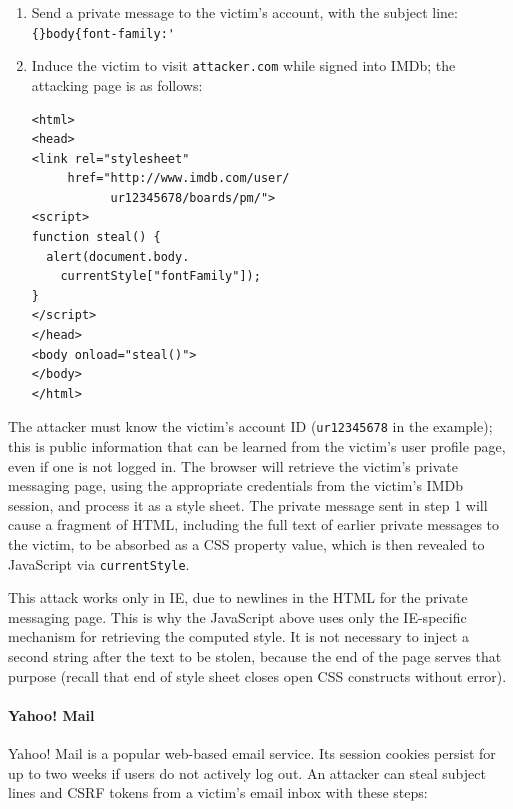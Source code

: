 \documentclass{acm_proc_article-sp}
\begin{document}
\begin{enumerate}
\item Send a private message to the victim's account, with the subject
  line: \verb|{}body{font-family:'|
\item Induce the victim to visit \texttt{attacker.com} while signed
  into IMDb; the attacking page is as follows:
\begin{verbatim}
<html>
<head>
<link rel="stylesheet"
     href="http://www.imdb.com/user/
           ur12345678/boards/pm/">
<script>
function steal() {
  alert(document.body.
    currentStyle["fontFamily"]);
}
</script>
</head>
<body onload="steal()">
</body>
</html>
\end{verbatim}
\end{enumerate}

The attacker must know the victim's account ID (\texttt{ur12345678} in
the example); this is public information that can be learned from the
victim's user profile page, even if one is not logged in.  The browser
will retrieve the victim's private messaging page, using the
appropriate credentials from the victim's IMDb session, and process it
as a style sheet.  The private message sent in step 1 will cause a
fragment of HTML, including the full text of earlier private messages
to the victim, to be absorbed as a CSS property value, which is then
revealed to JavaScript via \texttt{currentStyle}.

This attack works only in IE, due to newlines in the HTML for the
private messaging page.  This is why the JavaScript above uses only
the IE-specific mechanism for retrieving the computed style.  It is
not necessary to inject a second string after the text to be stolen,
because the end of the page serves that purpose (recall that end of
style sheet closes open CSS constructs without error).

\paragraph{Yahoo! Mail}
Yahoo! Mail is a popular web-based email service.  Its session cookies
persist for up to two weeks if users do not actively log out.  An
attacker can steal subject lines and CSRF tokens from a victim's email
inbox with these steps:
\end{document}
